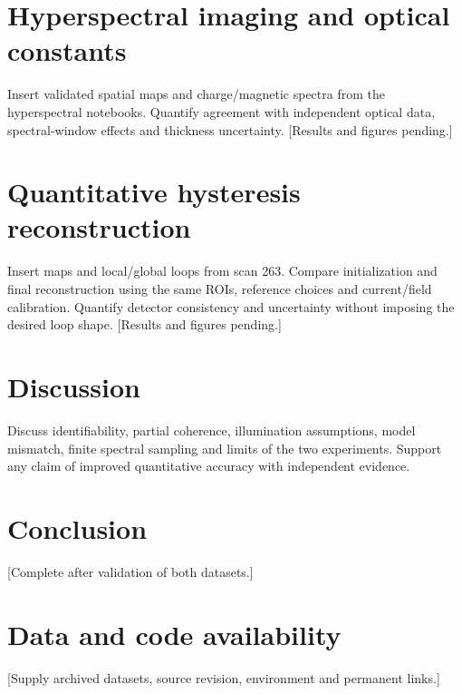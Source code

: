 \documentclass[11pt]{article}
\begin{document}
\section{Hyperspectral imaging and optical constants}
Insert validated spatial maps and charge/magnetic spectra from the hyperspectral notebooks. Quantify agreement with independent optical data, spectral-window effects and thickness uncertainty. [Results and figures pending.]
\section{Quantitative hysteresis reconstruction}
Insert maps and local/global loops from scan 263. Compare initialization and final reconstruction using the same ROIs, reference choices and current/field calibration. Quantify detector consistency and uncertainty without imposing the desired loop shape. [Results and figures pending.]
\section{Discussion}
Discuss identifiability, partial coherence, illumination assumptions, model mismatch, finite spectral sampling and limits of the two experiments. Support any claim of improved quantitative accuracy with independent evidence.
\section{Conclusion}
[Complete after validation of both datasets.]
\section*{Data and code availability}
[Supply archived datasets, source revision, environment and permanent links.]
\end{document}
